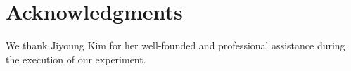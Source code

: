 \section{Acknowledgments}
We thank Jiyoung Kim for her well-founded and professional assistance during the execution of our experiment.
